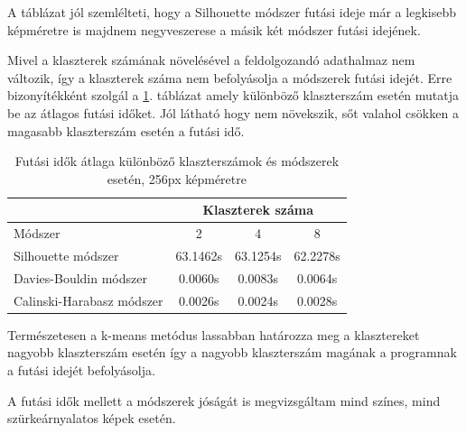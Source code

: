A táblázat jól szemlélteti, hogy a Silhouette módszer futási ideje már a legkisebb képméretre is majdnem negyveszerese a másik két módszer futási idejének.

Mivel a klaszterek számának növelésével a feldolgozandó adathalmaz nem változik, így a klaszterek száma nem befolyásolja a módszerek futási idejét. Erre bizonyítékként szolgál a \ref{tab:cluster_runtimes}. táblázat amely különböző klaszterszám esetén mutatja be az átlagos futási időket. Jól látható hogy nem növekszik, sőt valahol csökken a magasabb klaszterszám esetén a futási idő.

\begin{table}[h]
\centering
\caption{Futási idők átlaga különböző klaszterszámok és módszerek esetén, 256px képméretre}
\label{tab:cluster_runtimes}
\medskip
\begin{tabular}{|l|c|c|c|}
\cline{2-4}
 \multicolumn{1}{c|}{} & \multicolumn{3}{c|}{Klaszterek száma} \\
 \hline
 Módszer & 2 & 4 & 8 \\
\hline
Silhouette módszer & 63.1462s & 63.1254s & 62.2278s \\
Davies-Bouldin módszer & 0.0060s & 0.0083s & 0.0064s \\
Calinski-Harabasz módszer & 0.0026s & 0.0024s & 0.0028s \\
\hline
\end{tabular}
\end{table}

Természetesen a k-means metódus lassabban határozza meg a klasztereket nagyobb klaszterszám esetén így a nagyobb klaszterszám magának a programnak a futási idejét befolyásolja.

A futási idők mellett a módszerek jóságát is megvizsgáltam mind színes, mind szürkeárnyalatos képek esetén.

